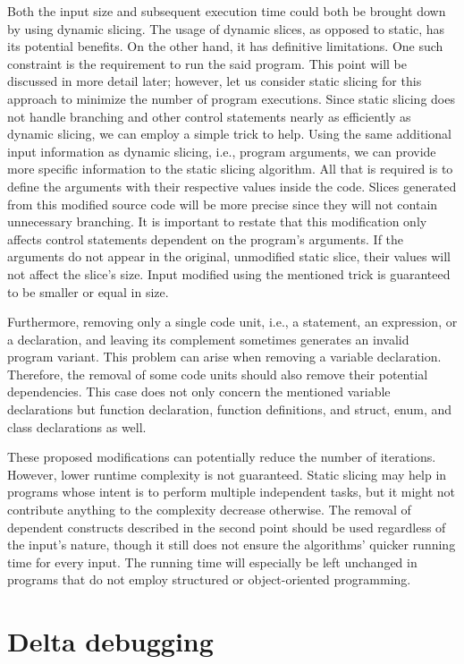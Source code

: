 Both the input size and subsequent execution time could both be brought 
down by using dynamic slicing.
The usage of dynamic slices, as opposed to static, has its potential benefits.
On the other hand, it has definitive limitations.
One such constraint is the requirement to run the said program.
This point will be discussed in more detail later; however, let us consider 
static slicing for this approach to minimize the number of program executions.
Since static slicing does not handle branching and other control statements 
nearly as efficiently as dynamic slicing, we can employ a simple trick 
to help.
Using the same additional input information as dynamic slicing, i.e., 
program arguments, we can provide more specific information 
to the static slicing algorithm.
All that is required is to define the arguments with their respective 
values inside the code.
Slices generated from this modified source code will be more precise 
since they will not contain unnecessary branching.
It is important to restate that this modification only affects control 
statements dependent on the program's arguments.
If the arguments do not appear in the original, unmodified static slice, 
their values will not affect the slice's size.
Input modified using the mentioned trick is guaranteed to be smaller or 
equal in size.

Furthermore, removing only a single code unit, i.e., a statement, 
an expression, or a declaration, and leaving its complement sometimes 
generates an invalid program variant.
This problem can arise when removing a variable declaration.
Therefore, the removal of some code units should also remove their potential 
dependencies.
This case does not only concern the mentioned variable declarations but 
function declaration, function definitions, and struct, enum, 
and class declarations as well.

These proposed modifications can potentially reduce the number of iterations.
However, lower runtime complexity is not guaranteed.
Static slicing may help in programs whose intent is to perform multiple 
independent tasks, but it might not contribute anything to the complexity 
decrease otherwise.
The removal of dependent constructs described in the second point should be 
used regardless of the input's nature, though it still does not ensure 
the algorithms' quicker running time for every input.
The running time will especially be left unchanged in programs that do not 
employ structured or object-oriented programming.

\section{Delta debugging}

